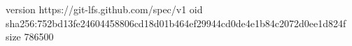version https://git-lfs.github.com/spec/v1
oid sha256:752bd13fe24604458806cd18d01b464ef29944cd0de4e1b84c2072d0ee1d824f
size 786500
